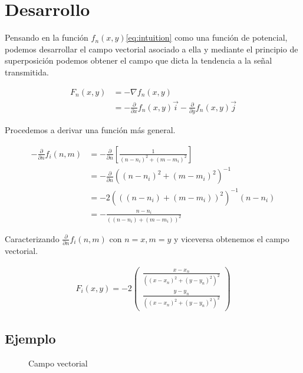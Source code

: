 \documentclass{article}
\newcommand{\partder}[1]{\frac{\partial}{\partial #1}}
\begin{document}
\section{Desarrollo}
Pensando en la función $f_n(x,y)$\ref{eq:intuition} como una función de
potencial, podemos desarrollar el campo vectorial asociado a ella y
mediante el principio de superposición podemos obtener el campo que
dicta la tendencia a la señal transmitida.

\begin{align}
  \label{eq:development}
  F_n\left( x, y \right) &= -\nabla f_n\left( x, y \right)\\
  &= - \partder{x} f_n \left( x, y \right) \vec{i} - \partder{y} f_n \left( x, y \right) \vec{j}
\end{align}

Procedemos a derivar una función más general.

\begin{align}
  \label{eq:derivative}
  - \partder{n} f_i \left( n, m \right) &= - \partder{n} \left[ \frac{1}{\left( n - n_i \right)^2 + \left( m - m_i \right)^2 } \right]\\
  &= - \partder{n} \left( \left( n - n_i \right)^2 + \left( m - m_i \right)^2 \right)^{-1}\\
  &= - 2\left( \left( \left( n - n_i \right) + \left( m - m_i \right) \right)^2 \right)^{-1} \left( n - n_i \right)\\
  &= - \frac{n - n_i}{\left( \left( n - n_i \right) + \left( m - m_i \right) \right)^2}
\end{align}

Caracterizando $\partder{n}f_i\left( n, m \right)$ con $n = x, m = y$ y viceversa
obtenemos el campo vectorial.

\begin{align}
  \label{eq:development2}
  F_i(x,y) = - 2 \left(
  \begin{array}{c}
    \frac{x - x_n}{\left( \left( x - x_n \right)^2 + \left( y - y_n \right)^2\right)^2}\\
    \frac{y - y_n}{\left( \left( x - x_n \right)^2 + \left( y - y_n \right)^2\right)^2}
  \end{array}
  \right)
\end{align}

\subsection{Ejemplo}
\begin{figure}[h!]
  \centering
  
  \caption{Campo vectorial}
  \label{fig:vecfield}
\end{figure}
\end{document}
